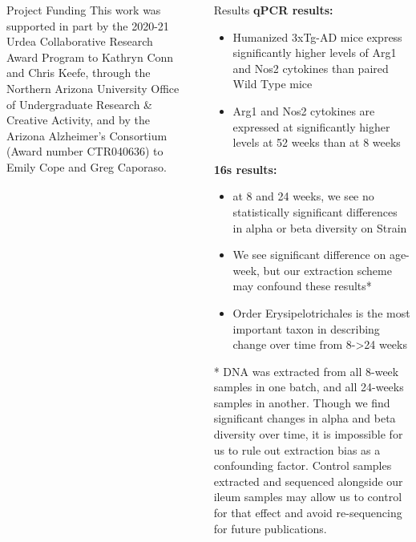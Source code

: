 \documentclass[final]{beamer}
\newlength{\sepwidth}
\newlength{\colwidth}
\newcommand{\separatorcolumn}{\begin{column}{\sepwidth}\end{column}}
\begin{document}
\begin{frame}[t]
\begin{columns}[t]
\begin{column}{\colwidth}
  \begin{block}{Project Funding}
    This work was supported in part by the 2020-21 Urdea Collaborative
    Research Award Program to Kathryn Conn and Chris Keefe, through the
    Northern Arizona University Office of Undergraduate Research \& Creative
    Activity, and by the Arizona Alzheimer’s Consortium (Award number
    CTR040636) to Emily Cope and Greg Caporaso.
  \end{block}

\end{column}

\separatorcolumn

\begin{column}{\colwidth}
    \begin{block}{Results}
      \textbf{qPCR results:}
      \begin{itemize}
        \item Humanized 3xTg-AD mice express significantly higher levels of Arg1 and Nos2 cytokines than paired Wild Type mice
        \item Arg1 and Nos2 cytokines are expressed at significantly higher levels at 52 weeks than at 8 weeks
      \end{itemize}

      \textbf{16s results:}
      \begin{itemize}
      \item at 8 and 24 weeks, we see no statistically significant differences in alpha or beta diversity on Strain
      \item We see significant difference on age-week, but our extraction scheme may confound these results*
      \item Order Erysipelotrichales is the most important taxon in describing change over time from 8->24 weeks
      \end{itemize}

    \begin{tcolorbox}
    [width=\textwidth, colframe=blue]
      * DNA was extracted from all 8-week samples in one batch, and all
      24-weeks samples in another. Though we find significant changes in
      alpha and beta diversity over time, it is impossible for us to rule out
      extraction bias as a confounding factor. Control samples extracted
      and sequenced alongside our ileum samples may allow us to control for 
      that effect and avoid re-sequencing for future publications. 
    \end{tcolorbox}


\end{block}
\end{column}
\end{columns}
\end{frame}
\end{document}
